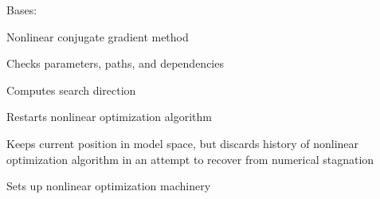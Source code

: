 \documentclass[letterpaper,10pt,english]{sphinxmanual}
\begin{document}
\begin{fulllineitems}
\label{\detokenize{ref/seisflows.optimize:seisflows.optimize.NLCG.NLCG}}
Bases: {\hyperref[\detokenize{ref/seisflows.optimize:seisflows.optimize.base.base}]{}}

Nonlinear conjugate gradient method

\begin{fulllineitems}
\label{\detokenize{ref/seisflows.optimize:seisflows.optimize.NLCG.NLCG.check}}
Checks parameters, paths, and dependencies

\end{fulllineitems}


\begin{fulllineitems}
\label{\detokenize{ref/seisflows.optimize:seisflows.optimize.NLCG.NLCG.compute_direction}}
Computes search direction

\end{fulllineitems}


\begin{fulllineitems}
\label{\detokenize{ref/seisflows.optimize:seisflows.optimize.NLCG.NLCG.restart}}
Restarts nonlinear optimization algorithm

Keeps current position in model space, but discards history of
nonlinear optimization algorithm in an attempt to recover from
numerical stagnation

\end{fulllineitems}


\begin{fulllineitems}
\label{\detokenize{ref/seisflows.optimize:seisflows.optimize.NLCG.NLCG.setup}}
Sets up nonlinear optimization machinery

\end{fulllineitems}


\end{fulllineitems}
\end{document}
